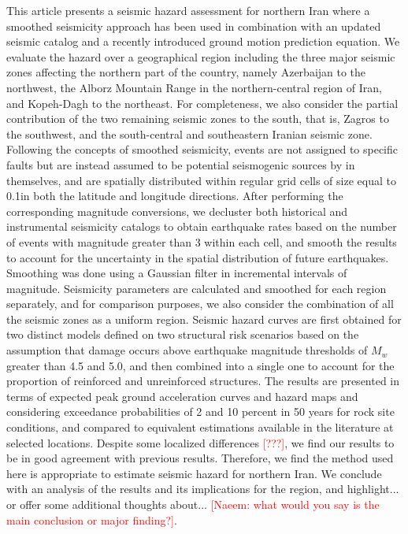 % 
This article presents a seismic hazard assessment for northern Iran where a smoothed seismicity approach has been used in combination with an updated seismic catalog and a recently introduced ground motion prediction equation. We evaluate the hazard over a geographical region including the three major seismic zones affecting the northern part of the country, namely Azerbaijan to the northwest, the Alborz Mountain Range in the northern-central region of Iran, and Kopeh-Dagh to the northeast. For completeness, we also consider the partial contribution of the two remaining seismic zones to the south, that is, Zagros to the southwest, and the south-central and southeastern Iranian seismic zone. Following the concepts of smoothed seismicity, events are not assigned to specific faults but are instead assumed to be potential seismogenic sources by in themselves, and are spatially distributed within regular grid cells of size equal to 0.1\textdegree in both the latitude and longitude directions. After performing the corresponding magnitude conversions, we decluster both historical and instrumental seismicity catalogs to obtain earthquake rates based on the number of events with magnitude greater than 3 within each cell, and smooth the results to account for the uncertainty in the spatial distribution of future earthquakes. Smoothing was done using a Gaussian filter in incremental intervals of magnitude. Seismicity parameters are calculated and smoothed for each region separately, and for comparison purposes, we also consider the combination of all the seismic zones as a uniform region. Seismic hazard curves are first obtained for two distinct models defined on two structural risk scenarios based on the assumption that damage occurs above earthquake magnitude thresholds of $M_w$ greater than 4.5 and 5.0, and then combined into a single one to account for the proportion of reinforced and unreinforced structures. The results are presented in terms of expected peak ground acceleration curves and hazard maps and considering exceedance probabilities of 2 and 10 percent in 50 years for rock site conditions, and compared to equivalent estimations available in the literature at selected locations. Despite some localized differences \textcolor{red}{[???]}, we find our results to be in good agreement with previous results. Therefore, we find the method used here is appropriate to estimate seismic hazard for northern Iran. We conclude with an analysis of the results and its implications for the region, and highlight... or offer some additional thoughts about... \textcolor{red}{[Naeem: what would you say is the main conclusion or major finding?]}.

